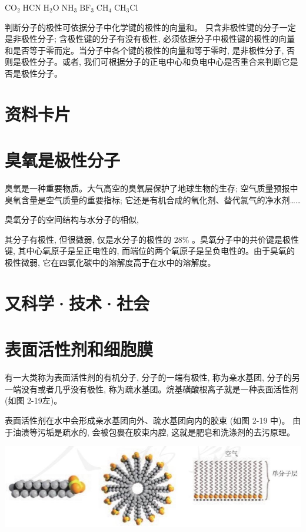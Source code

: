\documentclass[10pt]{article}
\begin{document}
\({\mathrm{{CO}}}_{2}\;\mathrm{{HCN}}\;{\mathrm{H}}_{2}\mathrm{O}\;{\mathrm{{NH}}}_{3}\;{\mathrm{{BF}}}_{3}\;{\mathrm{{CH}}}_{4}\;{\mathrm{{CH}}}_{3}\mathrm{{Cl}}\)

判断分子的极性可依据分子中化学键的极性的向量和。 只含非极性键的分子一定是非极性分子; 含极性键的分子有没有极性, 必须依据分子中极性键的极性的向量和是否等于零而定。当分子中各个键的极性的向量和等于零时, 是非极性分子, 否则是极性分子。或者, 我们可根据分子的正电中心和负电中心是否重合来判断它是否是极性分子。

\section*{资料卡片}

\section*{臭氧是极性分子}

臭氧是一种重要物质。大气高空的臭氧层保护了地球生物的生存; 空气质量预报中臭氧含量是空气质量的重要指标; 它还是有机合成的氧化剂、替代氯气的净水剂……

臭氧分子的空间结构与水分子的相似,

其分子有极性, 但很微弱, 仅是水分子的极性的 \({28}\%\) 。臭氧分子中的共价键是极性键, 其中心氧原子是呈正电性的, 而端位的两个氧原子是呈负电性的。由于臭氧的极性微弱, 它在四氯化碳中的溶解度高于在水中的溶解度。

\section*{又科学·技术·社会}

\section*{表面活性剂和细胞膜}

有一大类称为表面活性剂的有机分子, 分子的一端有极性, 称为亲水基团, 分子的另一端没有或者几乎没有极性, 称为疏水基团。烷基磺酸根离子就是一种表面活性剂 (如图 2-19左)。

表面活性剂在水中会形成亲水基团向外、疏水基团向内的胶束 (如图 2-19 中)。 由于油渍等污垢是疏水的, 会被包裹在胶束内腔, 这就是肥皂和洗涤剂的去污原理。

\begin{center}
\includegraphics[max width=1.0\textwidth]{images/0190e026-5a11-7df7-bd27-54d09026ba7a_56_528485.jpg}
\end{center}
\end{document}
